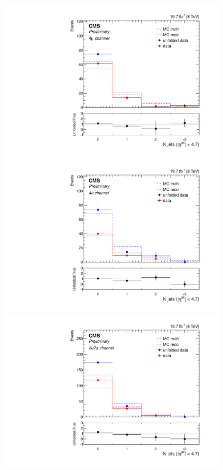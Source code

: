 \begin{figure}[hbtp]
  \begin{center}
    \includegraphics[width=\cmsFigWidth]{Figures/Jets_ZZTo4m_Mad_fr_binwidth}
    \includegraphics[width=\cmsFigWidth]{Figures/Jets_ZZTo4e_Mad_fr_binwidth}
    \includegraphics[width=\cmsFigWidth]{Figures/Jets_ZZTo2e2m_Mad_fr_binwidth}     

\end{center}
\end{figure}
